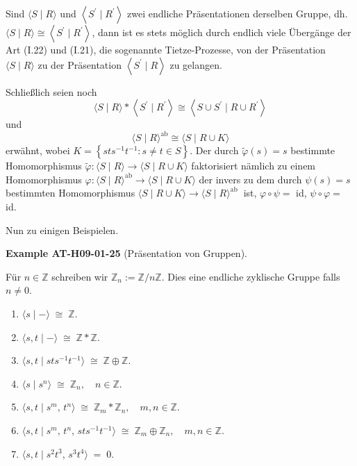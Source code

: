 \documentclass[10pt, letterpaper]{article}
\newcommand{\CustomHeading}[3]{%
  \par\medskip\noindent%
  \textbf{#1 #2} \textnormal{(#3)}.\enskip%
}
\newenvironment{EXA}[2]{\begin{unitbox}\CustomHeading{Example}{#1}{#2}}{\end{unitbox}}
\begin{document}
Sind $\langle S \mid R\rangle$ und $\left\langle S^{\prime} \mid R^{\prime}\right\rangle$ zwei endliche Präsentationen derselben Gruppe, dh. $\langle S \mid R\rangle \cong\left\langle S^{\prime} \mid R^{\prime}\right\rangle$, dann ist es stets möglich durch endlich viele Übergänge der Art (I.22) und (I.21), die sogenannte Tietze-Prozesse, von der Präsentation $\langle S \mid R\rangle$ zu der Präsentation $\left\langle S^{\prime} \mid R\right\rangle$ zu gelangen.

Schließlich seien noch
$$
\langle S \mid R\rangle *\left\langle S^{\prime} \mid R^{\prime}\right\rangle \cong\left\langle S \cup S^{\prime} \mid R \cup R^{\prime}\right\rangle
$$
und
$$
\langle S \mid R\rangle^{\mathrm{ab}} \cong\langle S \mid R \cup K\rangle
$$
erwähnt, wobei $K=\left\{s t s^{-1} t^{-1}: s \neq t \in S\right\}$. Der durch $\tilde{\varphi}(s)=s$ bestimmte Homomorphismus $\tilde{\varphi}:\langle S \mid R\rangle \rightarrow\langle S \mid R \cup K\rangle$ faktorisiert nämlich zu einem Homomorphismus $\varphi:\langle S \mid R\rangle^{\mathrm{ab}} \rightarrow\langle S \mid R \cup K\rangle$ der invers zu dem durch $\psi(s)=s$ bestimmten Homomorphismus $\langle S \mid R \cup K\rangle \rightarrow\langle S \mid R\rangle^{\text {ab }}$ ist, $\varphi \circ \psi=$ id, $\psi \circ \varphi=$ id.

Nun zu einigen Beispielen. 

\begin{EXA}{AT-H09-01-25}{Präsentation von Gruppen}
Für $n \in \mathbb{Z}$ schreiben wir $\mathbb{Z}_n:=\mathbb{Z} / n \mathbb{Z}$. Dies eine endliche zyklische Gruppe falls $n \neq 0$.
\begin{enumerate}[label=(\roman*)]
  \item $\langle s \mid - \rangle \;\cong\; \mathbb{Z}.$
  \item $\langle s, t \mid - \rangle \;\cong\; \mathbb{Z} * \mathbb{Z}.$
  \item $\langle s, t \mid s t s^{-1} t^{-1} \rangle \;\cong\; \mathbb{Z} \oplus \mathbb{Z}.$
  \item $\langle s \mid s^{n} \rangle \;\cong\; \mathbb{Z}_{n}, \quad n \in \mathbb{Z}.$
  \item $\langle s, t \mid s^{m},\, t^{n} \rangle \;\cong\; \mathbb{Z}_{m} * \mathbb{Z}_{n}, \quad m,n \in \mathbb{Z}.$
  \item $\langle s, t \mid s^{m},\, t^{n},\, s t s^{-1} t^{-1} \rangle 
        \;\cong\; \mathbb{Z}_{m} \oplus \mathbb{Z}_{n}, \quad m,n \in \mathbb{Z}.$
  \item $\langle s, t \mid s^{2} t^{3},\, s^{3} t^{4} \rangle \;=\; 0.$
\end{enumerate}
\end{EXA}
\end{document}
